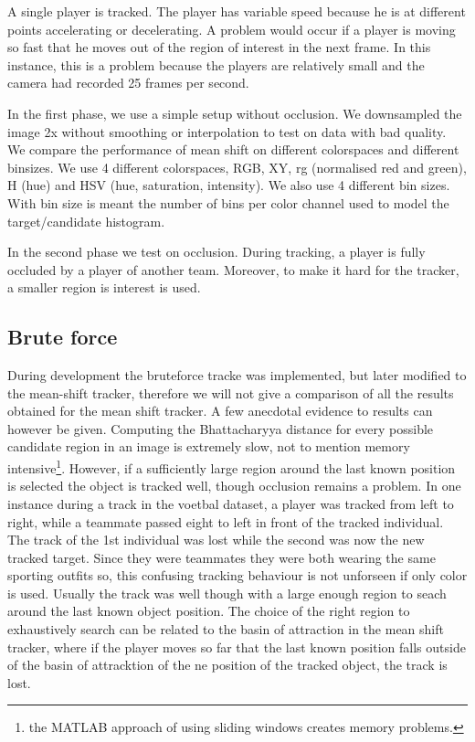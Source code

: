 \documentclass[a4paper,11pt]{article}
\begin{document}
	A single player is tracked. The player has variable speed because he is at
	different points accelerating or decelerating. A problem would occur if a
	player is moving so fast that he moves out of the region of interest in the
	next frame. In this instance, this is a problem because the players are
	relatively small and the camera had recorded 25 frames per second.
	
	In the first phase, we use a simple setup without occlusion. We downsampled
	the image 2x without smoothing or interpolation to test on data with bad
	quality.  We compare the performance of mean shift on different colorspaces
	and different binsizes.  We use 4 different colorspaces, RGB, XY, rg
	(normalised red and green), H (hue) and HSV (hue, saturation, intensity). We
	also use 4 different bin sizes. With bin size is meant the number of bins
	per color channel used to model the target/candidate histogram.

	In the second phase we test on occlusion. During tracking, a player is fully
	occluded by a player of another team. Moreover, to make it hard for the
	tracker, a smaller region is interest is used. 

	\subsection{Brute force} 
	During development the bruteforce tracke was implemented, but later modified to the mean-shift tracker, therefore we will not give a comparison of all the results obtained for the mean shift tracker. A few anecdotal evidence to results can however be given. Computing the Bhattacharyya distance for every possible candidate region in an image is extremely slow, not to mention memory intensive\footnote{the MATLAB approach of using sliding windows creates memory problems.}. However, if a sufficiently large region around the last known position is selected the object is tracked well, though occlusion remains a problem. In one instance during a track in the voetbal dataset, a player was tracked from left to right, while a teammate passed eight to left in front of the tracked individual. The track of the 1st individual was lost while the second was now the new tracked target. Since they were teammates they were both wearing the same sporting outfits so, this confusing tracking behaviour is not unforseen if only color is used. Usually the track was well though with a large enough region to seach around the last known object position. The choice of the right region to exhaustively search can be related to the basin of attraction in the mean shift tracker, where if the player moves so far that the last known position falls outside of the basin of attracktion of the ne position of the tracked object, the track is lost.
\end{document}
